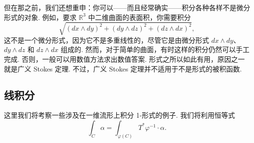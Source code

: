 但在那之前，我们还想重申：你可以——而且经常确实——积分各种各样不是微分形式的对象. 例如，要求 $\mathbb{R}^3$ 中二维曲面的表面积，你需要积分
\[
\sqrt{(dx\wedge dy)^2+(dy\wedge dz)^2+(dz\wedge dx)^2},
\]
这不是一个微分形式，因为它不是多重线性的，尽管它是由微分形式 $dx\wedge dy$、$dy\wedge dz$ 和 $dz\wedge dx$ 组成的. 然而，对于简单的曲面，有时这样的积分仍然可以手工完成. 否则，一般可以用数值方法求出数值答案. 形式之所以如此有用，原因之一就是广义 Stokes 定理. 不过，广义 Stokes 定理并不适用于不是形式的被积函数.

\subsection{线积分}

这里我们将考察一些涉及在一维流形上积分 1-形式的例子. 我们将利用恒等式
\[
\int_C\alpha=\int_{\varphi(C)}T^*\varphi^{-1}\cdot\alpha.
\]


